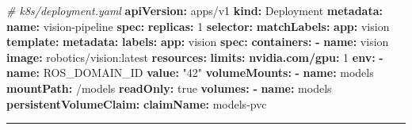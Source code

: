 \documentclass[
]{article}
\newenvironment{Shaded}{\begin{snugshade}}{\end{snugshade}}
\newcommand{\AttributeTok}[1]{\textcolor[rgb]{0.13,0.29,0.53}{#1}}
\newcommand{\CharTok}[1]{\textcolor[rgb]{0.31,0.60,0.02}{#1}}
\newcommand{\CommentTok}[1]{\textcolor[rgb]{0.56,0.35,0.01}{\textit{#1}}}
\newcommand{\DecValTok}[1]{\textcolor[rgb]{0.00,0.00,0.81}{#1}}
\newcommand{\FunctionTok}[1]{\textcolor[rgb]{0.13,0.29,0.53}{\textbf{#1}}}
\newcommand{\KeywordTok}[1]{\textcolor[rgb]{0.13,0.29,0.53}{\textbf{#1}}}
\newcommand{\StringTok}[1]{\textcolor[rgb]{0.31,0.60,0.02}{#1}}
\begin{document}
\begin{Shaded}
\begin{Highlighting}[]
\CommentTok{\# k8s/deployment.yaml}
\FunctionTok{apiVersion}\KeywordTok{:}\AttributeTok{ apps/v1}
\FunctionTok{kind}\KeywordTok{:}\AttributeTok{ Deployment}
\FunctionTok{metadata}\KeywordTok{:}
\AttributeTok{  }\FunctionTok{name}\KeywordTok{:}\AttributeTok{ vision{-}pipeline}
\FunctionTok{spec}\KeywordTok{:}
\AttributeTok{  }\FunctionTok{replicas}\KeywordTok{:}\AttributeTok{ }\DecValTok{1}
\AttributeTok{  }\FunctionTok{selector}\KeywordTok{:}
\AttributeTok{    }\FunctionTok{matchLabels}\KeywordTok{:}
\AttributeTok{      }\FunctionTok{app}\KeywordTok{:}\AttributeTok{ vision}
\AttributeTok{  }\FunctionTok{template}\KeywordTok{:}
\AttributeTok{    }\FunctionTok{metadata}\KeywordTok{:}
\AttributeTok{      }\FunctionTok{labels}\KeywordTok{:}
\AttributeTok{        }\FunctionTok{app}\KeywordTok{:}\AttributeTok{ vision}
\AttributeTok{    }\FunctionTok{spec}\KeywordTok{:}
\AttributeTok{      }\FunctionTok{containers}\KeywordTok{:}
\AttributeTok{      }\KeywordTok{{-}}\AttributeTok{ }\FunctionTok{name}\KeywordTok{:}\AttributeTok{ vision}
\AttributeTok{        }\FunctionTok{image}\KeywordTok{:}\AttributeTok{ robotics/vision:latest}
\AttributeTok{        }\FunctionTok{resources}\KeywordTok{:}
\AttributeTok{          }\FunctionTok{limits}\KeywordTok{:}
\AttributeTok{            }\FunctionTok{nvidia.com/gpu}\KeywordTok{:}\AttributeTok{ }\DecValTok{1}
\AttributeTok{        }\FunctionTok{env}\KeywordTok{:}
\AttributeTok{        }\KeywordTok{{-}}\AttributeTok{ }\FunctionTok{name}\KeywordTok{:}\AttributeTok{ ROS\_DOMAIN\_ID}
\AttributeTok{          }\FunctionTok{value}\KeywordTok{:}\AttributeTok{ }\StringTok{"42"}
\AttributeTok{        }\FunctionTok{volumeMounts}\KeywordTok{:}
\AttributeTok{        }\KeywordTok{{-}}\AttributeTok{ }\FunctionTok{name}\KeywordTok{:}\AttributeTok{ models}
\AttributeTok{          }\FunctionTok{mountPath}\KeywordTok{:}\AttributeTok{ /models}
\AttributeTok{          }\FunctionTok{readOnly}\KeywordTok{:}\AttributeTok{ }\CharTok{true}
\AttributeTok{      }\FunctionTok{volumes}\KeywordTok{:}
\AttributeTok{      }\KeywordTok{{-}}\AttributeTok{ }\FunctionTok{name}\KeywordTok{:}\AttributeTok{ models}
\AttributeTok{        }\FunctionTok{persistentVolumeClaim}\KeywordTok{:}
\AttributeTok{          }\FunctionTok{claimName}\KeywordTok{:}\AttributeTok{ models{-}pvc}
\end{Highlighting}
\end{Shaded}

\begin{center}\rule{0.5\linewidth}{0.5pt}\end{center}
\end{document}
